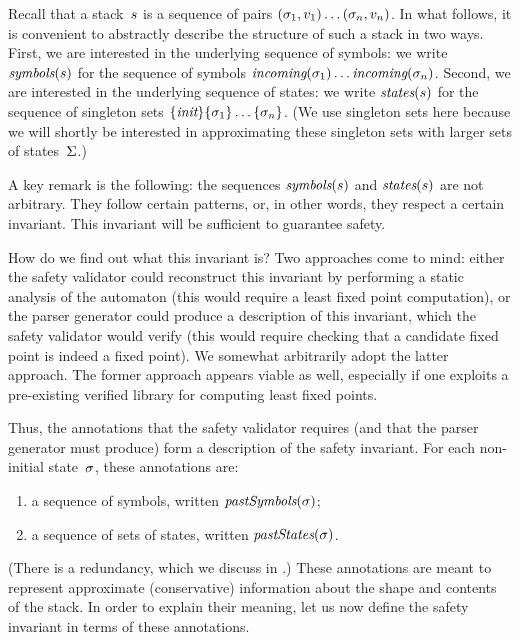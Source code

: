 \documentclass{llncs}
\begin{document}
Recall that a stack~$s$ is a sequence of pairs
$(\sigma_1,v_1)\ldots(\sigma_n,v_n)$. In what follows, it is convenient to
abstractly describe the structure of such a stack in two ways. First, we are
interested in the underlying sequence of symbols: we write
$\textit{symbols}(s)$ for the sequence of symbols
$\textit{incoming}(\sigma_1)\ldots\textit{incoming}(\sigma_n)$. Second, we are interested in the
underlying sequence of states: we write $\textit{states}(s)$ for the
sequence of singleton sets $\{\textit{init}\}\{\sigma_1\}\ldots\{\sigma_n\}$. (We use
singleton sets here because we will shortly be interested in approximating
these singleton sets with larger sets of states~$\Sigma$.)

A key remark is the following: the sequences $\textit{symbols}(s)$ and
$\textit{states}(s)$ are not arbitrary. They follow certain patterns, or, in
other words, they respect a certain invariant. This invariant will be
sufficient to guarantee safety.

How do we find out what this invariant is? Two approaches come to mind: either
the safety validator could reconstruct this invariant by performing a static
analysis of the automaton (this would require a least fixed point
computation), or the parser generator could produce a description of this
invariant, which the safety validator would verify (this would require
checking that a candidate fixed point is indeed a fixed point). We somewhat
arbitrarily adopt the latter approach. The former approach appears viable as
well, especially if one exploits a pre-existing verified library for computing
least fixed points.

Thus, the annotations that the safety validator requires (and that the parser
generator must produce) form a description of the safety invariant.  For each
non-initial state~$\sigma$, these annotations are:
\begin{enumerate}
\item a sequence of symbols, written $\textit{pastSymbols}(\sigma)$;
\item a sequence of sets of states, written $\textit{pastStates}(\sigma)$.
\end{enumerate}
(There is a redundancy, which we discuss in .)
These annotations are meant to represent approximate (conservative)
information about the shape and contents of the stack. In order to explain
their meaning, let us now define the safety invariant in terms of these
annotations.
\end{document}
